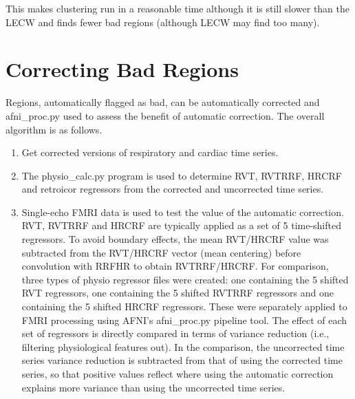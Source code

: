 \documentclass[twoside,twocolumn]{article}
\begin{document}
This makes clustering run in a reasonable time although it is still slower than the LECW and finds fewer bad regions (although LECW may find too many).

\section{Correcting Bad Regions}

Regions, automatically flagged as bad, can be automatically corrected and afni\_proc.py used to assess the benefit of automatic correction.  The overall algorithm is as follows.
\begin{enumerate}
	\item Get corrected versions of respiratory and cardiac time series.
	\item The physio\_calc.py program is used to determine RVT, RVTRRF, HRCRF and retroicor regressors from the corrected and uncorrected time series.
	\item Single-echo FMRI data is used to test the value of the automatic correction. RVT, RVTRRF and HRCRF are typically applied as a set of 5 time-shifted regressors. To avoid boundary effects, the mean RVT/HRCRF value was subtracted from the RVT/HRCRF vector (mean centering) before convolution with RRFHR to obtain RVTRRF/HRCRF. For comparison, three types of physio regressor files were created: one containing the 5 shifted RVT regressors, one containing the 5 shifted RVTRRF regressors and one containing the 5 shifted HRCRF regressors. These were separately applied to FMRI processing using AFNI's afni\_proc.py \cite{Reynolds2024} pipeline tool. The effect of each set of regressors is directly compared in terms of variance reduction (i.e., filtering physiological features out). In the comparison, the uncorrected time series variance reduction is subtracted from that of using the corrected time series, so that positive values reflect where using the automatic correction explains more variance than using the uncorrected time series. 
\end{enumerate}
\end{document}
